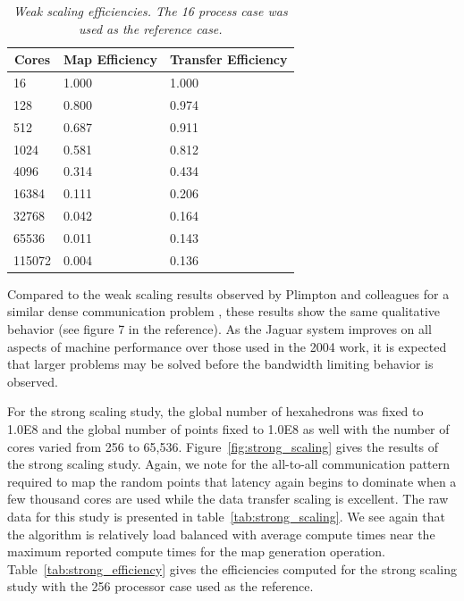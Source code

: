 \documentclass{mc2013}
\begin{document}
\begin{table}[htpb!]
  \begin{center}
    \begin{tabular}{lll}\hline\hline
      \multicolumn{1}{c}{Cores}& 
      \multicolumn{1}{c}{Map Efficiency} & 
      \multicolumn{1}{c}{Transfer Efficiency}\\\hline\hline
      16 &	1.000 &	1.000 \\
      128 &	0.800 &	0.974 \\
      512 &	0.687 &	0.911 \\
      1024 &	0.581 &	0.812 \\
      4096 &	0.314 &	0.434 \\
      16384 &	0.111 &	0.206 \\
      32768 &	0.042 &	0.164 \\
      65536 &	0.011 &	0.143 \\
      115072 &	0.004 &	0.136 \\
      \hline\hline
    \end{tabular}
  \end{center}
  \caption{\sl Weak scaling efficiencies. The 16 process case was used
    as the reference case.}
  \label{tab:weak_efficiency}
\end{table}

Compared to the weak scaling results observed by Plimpton and
colleagues for a similar dense communication problem
\cite{Plimpton_2004}, these results show the same qualitative behavior
(see figure 7 in the reference). As the Jaguar system improves on all
aspects of machine performance over those used in the 2004 work, it is
expected that larger problems may be solved before the bandwidth
limiting behavior is observed.

\label{subsec:strong_scaling}
For the strong scaling study, the global number of hexahedrons was
fixed to 1.0E8 and the global number of points fixed to 1.0E8 as well
with the number of cores varied from 256 to
65,536. Figure~\ref{fig:strong_scaling} gives the results of the
strong scaling study. Again, we note for the all-to-all communication
pattern required to map the random points that latency again begins to
dominate when a few thousand cores are used while the data transfer
scaling is excellent. The raw data for this study is presented in
table~\ref{tab:strong_scaling}. We see again that the algorithm is
relatively load balanced with average compute times near the maximum
reported compute times for the map generation
operation. Table~\ref{tab:strong_efficiency} gives the efficiencies
computed for the strong scaling study with the 256 processor case used
as the reference.
\end{document}
